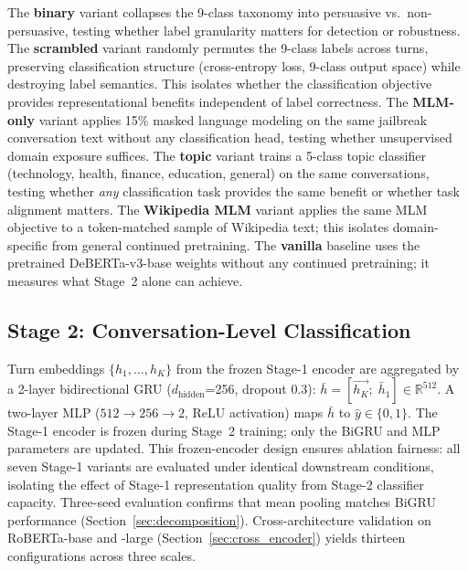 The \textbf{binary} variant collapses the 9-class taxonomy into persuasive vs.\ non-persuasive, testing whether label granularity matters for detection or robustness.
The \textbf{scrambled} variant randomly permutes the 9-class labels across turns, preserving classification structure (cross-entropy loss, 9-class output space) while destroying label semantics. This isolates whether the classification objective provides representational benefits independent of label correctness.
The \textbf{MLM-only} variant applies 15\% masked language modeling on the same jailbreak conversation text without any classification head, testing whether unsupervised domain exposure suffices.
The \textbf{topic} variant trains a 5-class topic classifier (technology, health, finance, education, general) on the same conversations, testing whether \emph{any} classification task provides the same benefit or whether task alignment matters.
The \textbf{Wikipedia MLM} variant applies the same MLM objective to a token-matched sample of Wikipedia text; this isolates domain-specific from general continued pretraining.
The \textbf{vanilla} baseline uses the pretrained DeBERTa-v3-base weights without any continued pretraining; it measures what Stage~2 alone can achieve.

\subsection{Stage 2: Conversation-Level Classification}

Turn embeddings $\{h_1, \ldots, h_K\}$ from the frozen Stage-1 encoder are aggregated by a 2-layer bidirectional GRU ($d_{\text{hidden}}$=256, dropout 0.3): $\bar{h} = [\overrightarrow{h_K};\; \overleftarrow{h_1}] \in \mathbb{R}^{512}$.
A two-layer MLP ($512 \to 256 \to 2$, ReLU activation) maps $\bar{h}$ to $\hat{y} \in \{0, 1\}$.
The Stage-1 encoder is frozen during Stage~2 training; only the BiGRU and MLP parameters are updated.
This frozen-encoder design ensures ablation fairness: all seven Stage-1 variants are evaluated under identical downstream conditions, isolating the effect of Stage-1 representation quality from Stage-2 classifier capacity.
Three-seed evaluation confirms that mean pooling matches BiGRU performance (Section~\ref{sec:decomposition}).
Cross-architecture validation on RoBERTa-base and -large (Section~\ref{sec:cross_encoder}) yields thirteen configurations across three scales.
